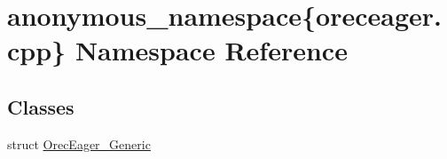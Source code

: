 \hypertarget{namespaceanonymous__namespace_02oreceager_8cpp_03}{\section{anonymous\-\_\-namespace\{oreceager.\-cpp\} Namespace Reference}
\label{namespaceanonymous__namespace_02oreceager_8cpp_03}
}
\subsection*{Classes}
\begin{DoxyCompactItemize}
\item 
struct \hyperlink{structanonymous__namespace_02oreceager_8cpp_03_1_1OrecEager__Generic}{Orec\-Eager\-\_\-\-Generic}
\end{DoxyCompactItemize}
